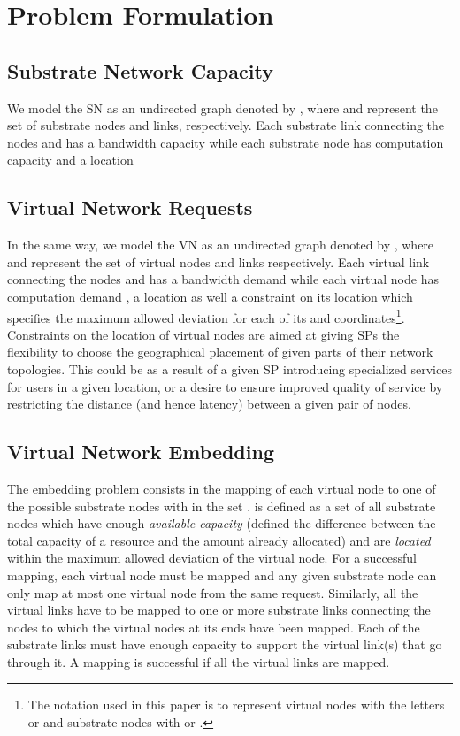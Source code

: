 \documentclass[journal]{IEEEtran}
\begin{document}
\section{Problem Formulation}
\subsection{Substrate Network Capacity}
We model the \ac{SN} as an undirected graph denoted by , where  and  represent the set of substrate nodes and links, respectively. Each substrate link  connecting the nodes  and  has a bandwidth capacity  while each substrate node  has computation capacity  and a location 
\subsection{Virtual Network Requests}
In the same way, we model the \ac{VN} as an undirected graph denoted by , where  and  represent the set of virtual nodes and links respectively. Each virtual link  connecting the nodes  and  has a bandwidth demand  while each virtual node  has computation demand , a location  as well a constraint on its location  which specifies the maximum allowed deviation for each of its  and  coordinates\footnote{The notation used in this paper is to represent virtual nodes with the letters  or  and substrate nodes with  or .}. Constraints on the location of virtual nodes are aimed at giving \acp{SP} the flexibility to choose the geographical placement of given parts of their network topologies. This could be as a result of a given \ac{SP} introducing specialized services for users in a given location, or a desire to ensure improved quality of service by restricting the distance (and hence latency) between a given pair of nodes.

\subsection{Virtual Network Embedding}
The embedding problem consists in the mapping of each virtual node  to one of the possible substrate nodes with in the set .  is defined as a set of all substrate nodes  which have enough \emph{available capacity} (defined the difference between the total capacity of a resource and the amount already allocated) and are \emph{located} within the maximum allowed deviation  of the virtual node. For a successful mapping, each virtual node must be mapped and any given substrate node can only map at most one virtual node from the same request.
Similarly, all the virtual links have to be mapped to one or more substrate links connecting the nodes to which the virtual nodes at its ends have been mapped. Each of the substrate links must have enough capacity to support the virtual link(s) that go through it. A mapping is successful if all the virtual links are mapped.
\end{document}
